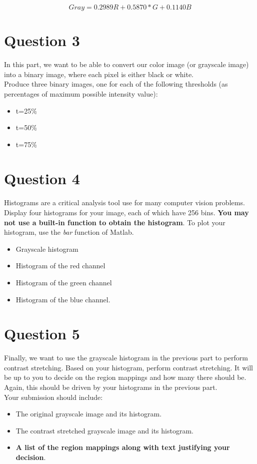 \documentclass{article}
\begin{document}
\begin{equation}
Gray=0.2989R+0.5870*G+0.1140B
\end{equation}


\section*{Question 3}
In this part, we want to be able to convert our color image (or grayscale image) into a binary image, where each pixel is either black or white.\\

\noindent
Produce three binary images, one for each of the following thresholds (as percentages of maximum possible intensity value):
\begin{itemize}
\item t=25\%
\item t=50\%
\item t=75\%
\end{itemize}


\section*{Question 4}
Histograms are a critical analysis tool use for many computer vision problems.  Display four histograms for your image, each of which have 256 bins.  \textbf{You may not use a built-in function to obtain the histogram}.  To plot your histogram, use the \emph{bar} function of Matlab.

\begin{itemize}
\item Grayscale histogram
\item Histogram of the red channel
\item Histogram of the green channel
\item Histogram of the blue channel.
\end{itemize}


\section*{Question 5}
Finally, we want to use the grayscale histogram in the previous part to perform contrast stretching.   Based on your histogram, perform contrast stretching.  It will be up to you to decide on the region mappings and how many there should be.  Again, this should be driven by your histograms in the previous part.\\

\noindent
Your submission should include:
\begin{itemize}
\item The original grayscale image and its histogram.
\item The contrast stretched grayscale image and its histogram.
\item \textbf{A list of the region mappings along with text justifying your decision}.
\end{itemize}
\end{document}
